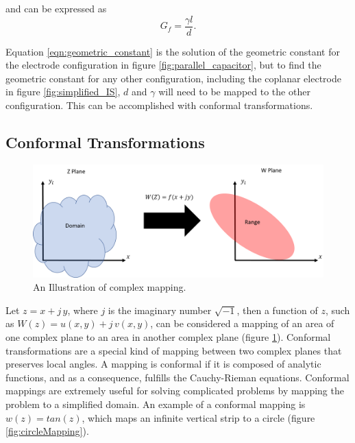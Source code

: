   \noindent and can be expressed as
  \begin{equation}
      G_f = \frac{\gamma l}{d}.
      \label{eqn:geometric_constant}
  \end{equation}
  
  \par Equation \ref{eqn:geometric_constant} is the solution of the geometric constant for the electrode configuration in figure \ref{fig:parallel_capacitor}, but to find the geometric constant for any other configuration, including the coplanar electrode in figure \ref{fig:simplified_IS}, $d$ and $\gamma$ will need to be mapped to the other configuration. This can be accomplished with conformal transformations.
  
  
  \subsection{Conformal Transformations}
  
  \begin{figure}[h]
  \centering
  \includegraphics[width=\textwidth]{images/mapping.png}
  \caption[Illustration of complex mapping.]{An Illustration of complex mapping.}
  \label{fig:mapping}
  \end{figure}
  
  \par Let $z = x + j\,y$, where $j$ is the imaginary number $\sqrt{-1}$, then a function of $z$, such as $W(z) = u(x,y) + j\,v(x,y)$, can be considered a mapping of an area of one complex plane to an area in another complex plane (figure \ref{fig:mapping}). Conformal transformations are a special kind of mapping between two complex planes that preserves local angles. A mapping is conformal if it is composed of analytic functions, and as a consequence, fulfills the Cauchy-Rieman equations. Conformal mappings are extremely useful for solving complicated problems by mapping the problem to a simplified domain. An example of a conformal mapping is $w(z) = tan(z)$, which maps an infinite vertical strip to a circle (figure \ref{fig:circleMapping}). 

